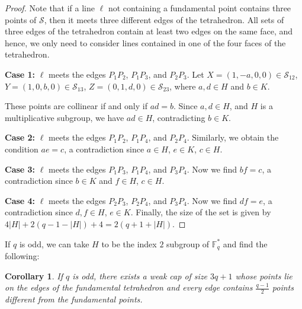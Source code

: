 \documentclass{article}
\newtheorem{corollary}{Corollary}
\newcommand{\F}{\mathbb{F}}
\begin{document}
\begin{proof}
Note that if a line $\ell$ not containing a fundamental point contains three points of $\mathcal S$, then it meets three different edges of the tetrahedron. All sets of three edges of the tetrahedron contain at least two edges on the same face, and hence, we only need to consider lines contained in one of the four faces of the tetrahedron.

\textbf{Case 1:} $\ell$ meets the edges $P_1P_2$, $P_1P_3$, and $P_2P_3$. Let
$
X=(1,-a,0,0)\in\mathcal S_{12}$, 
$Y=(1,0,b,0)\in\mathcal S_{13}$,
$Z=(0,1,d,0)\in\mathcal S_{23}$, where $a,d\in H$ and $b\in K$.

These points are collinear if and only if $ad=b$.
Since $a,d\in H$, and $H$ is a multiplicative subgroup, we have $ad\in H$, contradicting $b\in K$.


\textbf{Case 2:} $\ell$ meets the edges $P_1P_2$, $P_1P_4$, and $P_2P_4$.
Similarly, we obtain the condition $ae=c$, a contradiction since $a\in H$, $e\in K$, $c\in H$.


\textbf{Case 3:} $\ell$ meets the edges $P_1P_3$, $P_1P_4$, and $P_3P_4$.
Now we find  $bf=c$, a contradiction since $b\in K$ and $f\in H$, $c\in H$.

\textbf{Case 4:} $\ell$ meets the edges $P_2P_3$, $P_2P_4$, and $P_3P_4$.
Now we find $df=e$, a contradiction since $d,f\in H$, $e\in K$.
Finally, the size of the set is given by $4|H|+2(q-1-|H|)+4=2(q+1+|H|).$
\end{proof}

If $q$ is odd, we can take $H$ to be the index $2$ subgroup of $\F_q^*$ and find the following:
\begin{corollary}
   If $q$ is odd, there exists a weak cap of size $3q+1$ whose points lie on the edges of the fundamental tetrahedron and every edge contains $\frac{q-1}{2}$ points different from the fundamental points.
\end{corollary}
\end{document}
